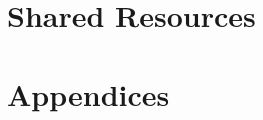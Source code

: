 \documentclass[12pt,a4paper,twoside]{report}
\begin{document}
\clearpage
{}

\chapter{Shared Resources}








%
%
%
%
%
%

\chapter{Appendices}




%
%
%
\end{document}
